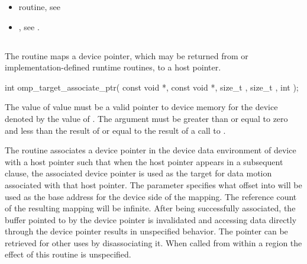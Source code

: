 \begin{ccppspecific}
\begin{itemize}
\item {} routine, see 


\item {}, see 
.

\end{itemize}

\subsection{}
\label{subsec:omp_target_associate_ptr}
\summary

The  routine maps a device pointer, which may
be returned from  or implementation-defined runtime 
routines, to a host pointer.

\format
\begin{ompcFunction}
int omp_target_associate_ptr(
  const void *,
  const void *,
  size_t ,
  size_t ,
  int 
);
\end{ompcFunction}

\constraints

The value of  value must be a valid pointer to device 
memory for the device denoted by the value of .
The  argument
must be greater than or equal to zero and less than the result of
 or equal to the result of a call to
.

\begin{figure}[t!]
\end{figure}

\effect

The  routine associates a device pointer
in the device data environment of device 
with a host pointer such that when the host pointer appears in a subsequent
 clause, the associated device pointer is used as the target for
data motion associated with that host pointer.  The 
parameter specifies what offset into  will be used as the
base address for the device side of the mapping.  The reference count of the
resulting mapping will be infinite.  After being successfully associated, the
buffer pointed to by the device pointer is invalidated and accessing data
directly through the device pointer results in unspecified behavior.  The
pointer can be retrieved for other uses by disassociating it.
When called from within a  region 
the effect of this routine is unspecified.


\end{ccppspecific}
